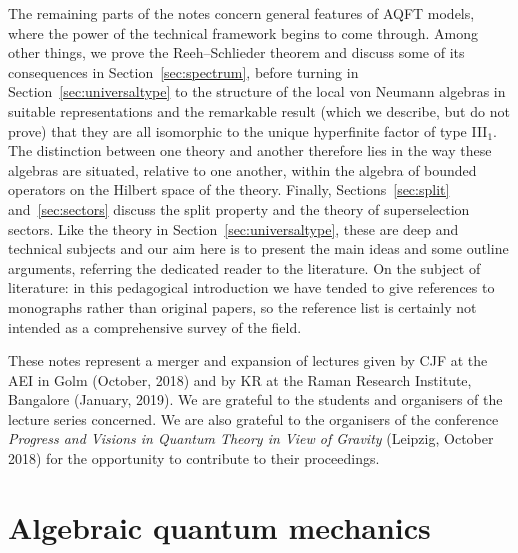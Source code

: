 \documentclass[12pt]{article}
\newcommand{\1}{\mathds{1}}                         %
\begin{document}
	The remaining parts of the notes concern general features of AQFT models, where the power of the technical framework begins to come through. Among other things, we prove the Reeh--Schlieder theorem and discuss some of its consequences in Section~\ref{sec:spectrum}, before turning in Section~\ref{sec:universaltype} to the structure of the local von Neumann algebras in suitable representations and the remarkable result (which we describe, but do not prove) that they are all isomorphic to the unique hyperfinite factor of type III${}_1$. The distinction between one theory and another therefore lies in the way these algebras are situated, relative to one another, within the algebra of bounded operators on the Hilbert space of the theory. Finally, Sections~\ref{sec:split} and~\ref{sec:sectors} discuss the split property and the theory of superselection sectors. Like the theory in Section~\ref{sec:universaltype}, these are deep and technical subjects and our aim here is to present the main ideas and some outline arguments, referring the dedicated reader to the literature. 
	On the subject of literature: in this pedagogical introduction we have tended to give references to monographs rather than original papers, so the reference list is certainly not intended as a comprehensive survey of the field. 
	
	These notes represent a merger and expansion of lectures given by CJF at the AEI in Golm (October, 2018) and by KR at the Raman Research Institute, Bangalore (January, 2019). We are grateful to the students and organisers of the lecture series concerned. We are also grateful to the organisers of the conference \emph{Progress and Visions in Quantum Theory in View of Gravity} (Leipzig, October 2018) for the opportunity to contribute to their proceedings.
	
\section{Algebraic quantum mechanics}\label{sec:algQM}
\end{document}
